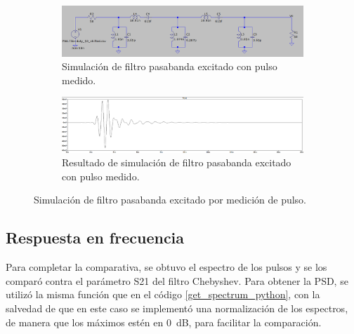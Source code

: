 \begin{figure}[t]
    \centering
    \begin{subfigure}[b]{0.45\textwidth}
        \centering
        \includegraphics[width=\linewidth]{images/passband_with_measurement.png}
        \caption{Simulación de filtro pasabanda excitado con pulso medido.}
        \label{fig:passband_with_measurement}
    \end{subfigure}
    \hfill
    \begin{subfigure}[b]{0.45\textwidth}
        \centering
        \includegraphics[width=\linewidth]{images/passband_with_measurement_result.png}
        \caption{Resultado de simulación de filtro pasabanda excitado con pulso
        medido.}
        \label{fig:passband_with_measurement_result}
    \end{subfigure}
    \caption{Simulación de filtro pasabanda excitado por medición de pulso.}
    \label{fig:passband_measurement}
\end{figure}

\subsection{Respuesta en frecuencia}

Para completar la comparativa, se obtuvo el espectro de los pulsos y se los
comparó contra el parámetro S21 del filtro Chebyshev. Para obtener la PSD, se
utilizó la misma función que en el código \ref{get_spectrum_python}, con la
salvedad de que en este caso se implementó una normalización de los espectros,
de manera que los máximos estén en \qty{0}{\dB}, para facilitar la comparación.

